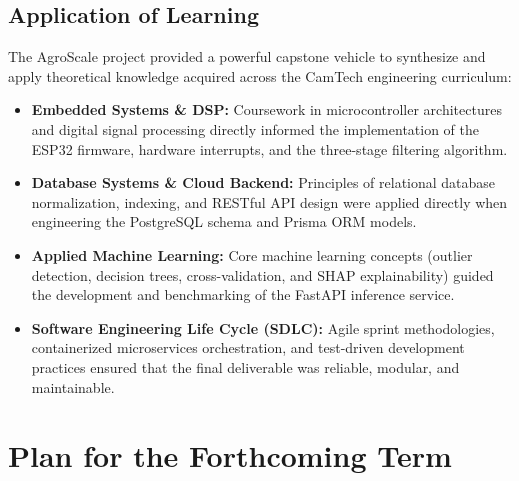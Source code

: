 \documentclass[11pt,a4paper]{report}
\begin{document}
\section{Application of Learning}
The AgroScale project provided a powerful capstone vehicle to synthesize and apply theoretical knowledge acquired across the CamTech engineering curriculum:
\begin{itemize}
    \item \textbf{Embedded Systems \& DSP:} Coursework in microcontroller architectures and digital signal processing directly informed the implementation of the ESP32 firmware, hardware interrupts, and the three-stage filtering algorithm.
    \item \textbf{Database Systems \& Cloud Backend:} Principles of relational database normalization, indexing, and RESTful API design were applied directly when engineering the PostgreSQL schema and Prisma ORM models.
    \item \textbf{Applied Machine Learning:} Core machine learning concepts (outlier detection, decision trees, cross-validation, and SHAP explainability) guided the development and benchmarking of the FastAPI inference service.
    \item \textbf{Software Engineering Life Cycle (SDLC):} Agile sprint methodologies, containerized microservices orchestration, and test-driven development practices ensured that the final deliverable was reliable, modular, and maintainable.
\end{itemize}

\clearpage

\chapter{Plan for the Forthcoming Term}
\end{document}
